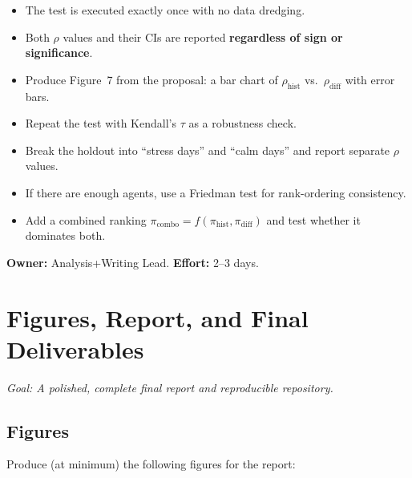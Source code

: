 \documentclass[11pt,a4paper]{article}
\begin{document}
\begin{successbox}
  \begin{itemize}[nosep]
    \item The test is executed exactly once with no data dredging.
    \item Both $\rho$ values and their CIs are reported \textbf{regardless of sign or significance}.
    \item Produce Figure~7 from the proposal: a bar chart of $\rho_{\text{hist}}$ vs.\ $\rho_{\text{diff}}$ with error bars.
  \end{itemize}
\end{successbox}

\begin{deepbox}
  \begin{itemize}[nosep]
    \item Repeat the test with Kendall's $\tau$ as a robustness check.
    \item Break the holdout into ``stress days'' and ``calm days'' and report separate $\rho$ values.
    \item If there are enough agents, use a Friedman test for rank-ordering consistency.
    \item Add a combined ranking $\pi_{\text{combo}} = f(\pi_{\text{hist}}, \pi_{\text{diff}})$ and test whether it dominates both.
  \end{itemize}
\end{deepbox}

\textbf{Owner:} Analysis+Writing Lead. \quad \textbf{Effort:} 2--3 days.


\section{Figures, Report, and Final Deliverables}

\textit{Goal: A polished, complete final report and reproducible repository.}

\subsection{Figures}

Produce (at minimum) the following figures for the report:
\end{document}
